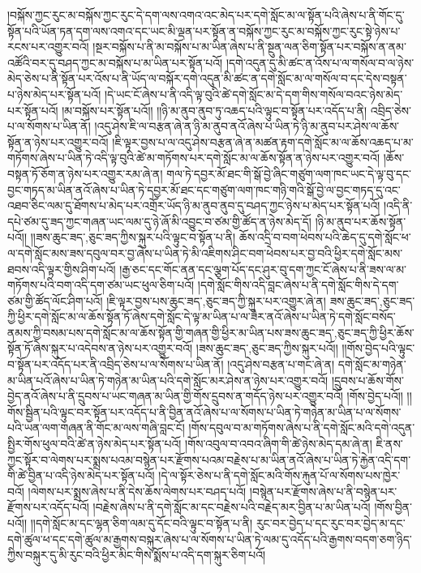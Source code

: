 །བསྐོས་ཀྱང་རུང་མ་བསྐོས་ཀྱང་རུང་དེ་དག་ལས་འགའ་འང་མེད་པར་དགེ་སློང་མ་ལ་སྟོན་པའི་ཞེས་པ་ནི་གོང་དུ་སྟོན་པའི་ཡོན་ཏན་དག་ལས་འགའ་དང་ཡང་མི་ལྡན་པར་སྟོན་ན་བསྐོས་ཀྱང་རུང་མ་བསྐོས་ཀྱང་རུང་སྟེ་ཉེས་པ་རངས་པར་འགྱུར་བའོ། །སྔར་བསྐོས་པ་ནི་མ་བསྐོས་པ་མ་ཡིན་ཞེས་པ་ནི་སྔུན་ལན་ཅིག་སྟོན་པར་བསྐོས་ན་ནམ་འཚོའི་བར་དུ་བཤད་ཀྱང་མ་བསྐོས་པ་མ་ཡིན་པར་སྟོན་པའོ། །དགེ་འདུན་དུ་མི་ཚང་ན་འོས་པ་ལ་གསོལ་བ་ལ་ཉེས་མེད་ཅེས་པ་ནི་སྟོན་པར་འོས་པ་ནི་ཡོད་ལ་བསྐོར་དགེ་འདུན་མི་ཚང་ན་དགེ་སློང་མ་ལ་གསོལ་བ་དང་དེས་བསྟན་པ་ཉེས་མེད་པར་སྟོན་པའོ། །དེ་ཡང་ངོ་ཞེས་པ་ནི་འདི་ལྟ་བུའི་ཚེ་དགེ་སློང་མ་དེ་དག་གིས་གསོལ་བའང་ཉེས་མེད་པར་སྟོན་པའོ། །མ་བསྐོས་པར་སྟོན་པའོ།། །།ཉི་མ་ནུབ་ནུབ་ཏུ་འཆད་པའི་ལྟུང་བ་སྟོན་པར་འདོད་པ་ནི། འབྲིད་ཅེས་པ་ལ་སོགས་པ་ཡིན་ནོ། །འདུ་ཤེས་ཇི་ལ་བརྩན་ཞེ་ན་ཉི་མ་ནུབ་ནའོ་ཞེས་པ་ཡིན་ཏེ་ཉི་མ་ནུབ་པར་ཤེས་ལ་ཆོས་སྟོན་ན་ཉེས་པར་འགྱུར་བའོ། །ཇི་ལྟར་བྱས་པ་ལ་འདུ་ཤེས་བརྩན་ཞེ་ན་མཚན་རྟག་དགེ་སློང་མ་ལ་ཆོས་འཆད་པ་མ་གཏོགས་ཞེས་པ་ཡིན་ཏེ་འདི་ལྟ་བུའི་ཚེ་མ་གཏོགས་པར་དགེ་སློང་མ་ལ་ཆོས་སྟོན་ན་ཉེས་པར་འགྱུར་བའོ། །ཆོས་བསྟན་ཏོ་ཅོག་ན་ཉེས་པར་འགྱུར་རམ་ཞེ་ན། གལ་ཏེ་དབྱར་མོ་ཐང་གི་སྒོ་བྱེ་ཞིང་གཙུག་ལག་ཁང་ཡང་དེ་ལྟ་བུ་དང་བྱང་གཏད་མ་ཡིན་ནའོ་ཞེས་པ་ཡིན་ཏེ་དབྱར་མོ་ཐང་དང་གཙུག་ལག་ཁང་གཉི་གའི་སྒོ་བྱེ་ལ་བྱང་གཏད་དུ་འང་འཐབ་ཅིང་ལམ་དུ་ཐོགས་པ་མེད་པར་འགྲོར་ཡོད་ཉི་མ་ནུབ་ནུབ་དུ་བཤད་ཀྱང་ཉེས་པ་མེད་པར་སྟོན་པའོ། །འདི་ནི་དཔེ་ཙམ་དུ་ཟད་ཀྱང་གཞན་ཡང་ལམ་དུ་ཉེ་ཞོ་མི་འབྱུང་བ་ཙམ་གྱི་ཚོད་ན་ཉེས་མེད་དོ། །ཉི་མ་ནུབ་པར་ཆོས་སྟོན་པའོ།། །།ཟས་{ཆུང་ཟད་,ཅུང་ཟད་}ཀྱིས་སྐུར་པའི་ལྟུང་བ་སྟོན་པ་ནི། ཆོས་འདྲི་བ་བག་ཕེབས་པའི་ཆེད་དུ་དགེ་སློང་ཕ་ལ་དགེ་སློང་མས་ཟས་དབུལ་བར་བྱ་ཞེས་པ་ཡིན་ཏེ་མི་འཇིགས་ཤིང་བག་ཕེབས་པར་བྱ་བའི་ཕྱིར་དགེ་སློང་མས་ཐབས་འདི་ལྟར་གྱིས་ཤིག་པའོ། །རྒྱ་ཅང་དང་གོང་ནན་དང་ལྕག་པོད་དང་ཤུར་བུ་དག་ཀྱང་ངོ་ཞེས་པ་ནི་ཟས་ལ་མ་གཏོགས་པའི་བག་འདི་དག་ཙམ་ཡང་ཕུལ་ཅིག་པའོ། །དགེ་སློང་གིས་འདི་བླང་ཞེས་པ་ནི་དགེ་སློང་གིས་དེ་དག་ཙམ་གྱི་ཚོད་ལོང་ཤིག་པའོ། །ཇི་ལྟར་བྱས་པས་{ཆུང་ཟད་,ཅུང་ཟད་}ཀྱི་སྐུར་པར་འགྱུར་ཞེ་ན། ཟས་{ཆུང་ཟད་,ཅུང་ཟད་}ཀྱི་ཕྱིར་དགེ་སློང་མ་ལ་ཆོས་སྟོན་ཏོ་ཞེས་དགེ་སློང་དེ་ལྟ་མ་ཡིན་པ་ལ་ཟེར་ནའོ་ཞེས་པ་ཡིན་ཏེ་དགེ་སློང་བསོད་ནམས་ཀྱི་བསམ་པས་དགེ་སློང་མ་ལ་ཆོས་སྟོན་གྱི་གཞན་གྱི་ཕྱིར་མ་ཡིན་པས་ཟས་{ཆུང་ཟད་,ཅུང་ཟད་}ཀྱི་ཕྱིར་ཆོས་སྟོན་ཏོ་ཞེས་སྐུར་པ་འདེབས་ན་ཉེས་པར་འགྱུར་བའོ། །ཟས་{ཆུང་ཟད་,ཅུང་ཟད་}ཀྱིས་སྐུར་པའོ།། །།གོས་བྱེད་པའི་ལྟུང་བ་སྟོན་པར་འདོད་པར་ནི་འབྲིད་ཅེས་པ་ལ་སོགས་པ་ཡིན་ནོ། །འདུ་ཤེས་བརྩན་པ་གང་ཞེ་ན། དགེ་སློང་མ་གཉེན་མ་ཡིན་པའོ་ཞེས་པ་ཡིན་ཏེ་གཉེན་མ་ཡིན་པའི་དགེ་སློང་མར་ཤེས་ན་ཉེས་པར་འགྱུར་བའོ། །དྲུབས་པ་ཆོས་གོས་བྱེད་ནའོ་ཞེས་པ་ནི་དྲུབས་པ་ཡང་གཞན་མ་ཡིན་གྱི་གོས་དྲུབས་ན་གདོད་ཉེས་པར་འགྱུར་བའོ། །གོས་བྱེད་པའོ།། །།གོས་སྦྱིན་པའི་ལྟུང་བར་སྟོན་པར་འདོད་པ་ནི་བྱིན་ནའོ་ཞེས་པ་ལ་སོགས་པ་ཡིན་ཏེ་གཉེན་མ་ཡིན་པ་ལ་སོགས་པའི་ཡན་ལག་གཞན་ནི་གོང་མ་ལས་གཞི་བླང་ངོ། །གོས་དབུལ་བ་མ་གཏོགས་ཞེས་པ་ནི་དགེ་སློང་མའི་དགེ་འདུན་སྤྱིར་གོས་ཕུལ་བའི་ཚེ་ན་ཉེས་མེད་པར་སྟོན་པའོ། །གོས་འབུལ་བ་འབའ་ཞིག་གི་ཚེ་ཉེས་མེད་དམ་ཞེ་ན། ཇི་ནས་ཀྱང་སྟོར་བ་ལེགས་པར་སྨྲས་པའམ་བསྙེན་པར་རྫོགས་པའམ་བརྗེས་པ་མ་ཡིན་ནའོ་ཞེས་པ་ཡིན་ཏེ་རྐྱེན་འདི་དག་གི་ཚེ་བྱིན་པ་འདི་ཉེས་མེད་པར་སྟོན་པའོ། །དེ་ལ་སྟོར་ཅེས་པ་ནི་དགེ་སློང་མའི་གོས་རྐུན་པོ་ལ་སོགས་པས་ཁྱེར་བའོ། །ལེགས་པར་སྨྲས་ཞེས་པ་ནི་དེས་ཆོས་ལེགས་པར་བཤད་པའོ། །བསྙེན་པར་རྫོགས་ཞེས་པ་ནི་བསྙེན་པར་རྫོགས་པར་འདོད་པའོ། །བརྗེས་ཞེས་པ་ནི་དགེ་སློང་མ་དང་བརྗེས་པའི་བརྗེད་མར་བྱིན་པ་མ་ཡིན་པའོ། །གོས་བྱིན་པའོ།། །།དགེ་སློང་མ་དང་ལྷན་ཅིག་ལམ་དུ་དོང་བའི་ལྟུང་བ་སྟོན་པ་ནི། རུང་བར་བྱེད་པ་དང་རུང་བར་བྱེད་མ་དང་དགེ་ཚུལ་ཕ་དང་དགེ་ཚུལ་མ་རྒྱགས་བསྐུར་ཞེས་པ་ལ་སོགས་པ་ཡིན་ཏེ་ལམ་དུ་འདོད་པའི་རྒྱགས་བདག་ཅག་ཉིད་ཀྱིས་བསྐུར་དུ་མི་རུང་བའི་ཕྱིར་མིང་གིས་སྨོས་པ་འདི་དག་སྐུར་ཅིག་པའོ། 